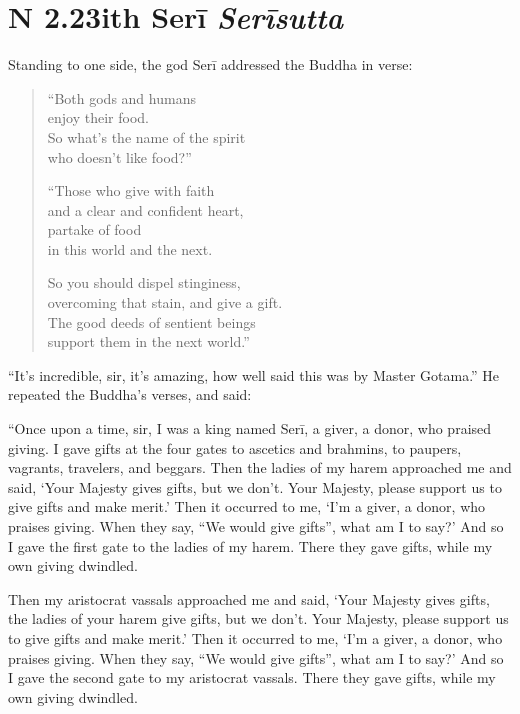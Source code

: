 \documentclass[12pt,openany]{book}%
\newcommand*{\suttatitleacronym}[1]{\smaller[2]{#1}\vspace*{.3em}}
\newcommand*{\suttatitletranslation}[1]{\linebreak{#1}}
\newcommand*{\suttatitleroot}[1]{\linebreak\smaller[2]\itshape{#1}}
\newcommand*{\tocacronym}[1]{\hspace*{-3.3em}{#1}\quad}
\newcommand*{\toctranslation}[1]{#1}
\newcommand*{\tocroot}[1]{(\textit{#1})}
\begin{document}
%
\section*{{\suttatitleacronym SN 2.23}{\suttatitletranslation With Serī }{\suttatitleroot Serīsutta}}
\addcontentsline{toc}{section}{\tocacronym{SN 2.23} \toctranslation{With Serī } \tocroot{Serīsutta}}

Standing to one side, the god \textsanskrit{Serī} addressed the Buddha in verse: 

\begin{verse}%
“Both gods and humans \\
enjoy their food. \\
So what’s the name of the spirit \\
who doesn’t like food?” 

“Those who give with faith \\
and a clear and confident heart, \\
partake of food \\
in this world and the next. 

So you should dispel stinginess, \\
overcoming that stain, and give a gift. \\
The good deeds of sentient beings \\
support them in the next world.” 

%
\end{verse}

“It’s incredible, sir, it’s amazing, how well said this was by Master Gotama.” He repeated the Buddha’s verses, and said: 

“Once upon a time, sir, I was a king named \textsanskrit{Serī}, a giver, a donor, who praised giving. I gave gifts at the four gates to ascetics and brahmins, to paupers, vagrants, travelers, and beggars. Then the ladies of my harem approached me and said, ‘Your Majesty gives gifts, but we don’t. Your Majesty, please support us to give gifts and make merit.’ Then it occurred to me, ‘I’m a giver, a donor, who praises giving. When they say, “We would give gifts”, what am I to say?’ And so I gave the first gate to the ladies of my harem. There they gave gifts, while my own giving dwindled. 

Then my aristocrat vassals approached me and said, ‘Your Majesty gives gifts, the ladies of your harem give gifts, but we don’t. Your Majesty, please support us to give gifts and make merit.’ Then it occurred to me, ‘I’m a giver, a donor, who praises giving. When they say, “We would give gifts”, what am I to say?’ And so I gave the second gate to my aristocrat vassals. There they gave gifts, while my own giving dwindled. 
\end{document}
